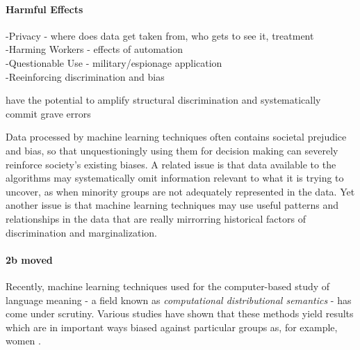 \documentclass{article}
\begin{document}
\paragraph{Harmful Effects}
-Privacy - where does data get taken from, who gets to see it, treatment\\
-Harming Workers - effects of automation\\
-Questionable Use - military/espionage application\\
-Reeinforcing discrimination and bias

have the potential to amplify structural discrimination and systematically commit grave errors

Data processed by machine learning techniques often contains societal prejudice and bias, so that unquestioningly using them for decision making can severely reinforce society's existing biases.
A related issue is that data available to the algorithms may systematically omit information relevant to what it is trying to uncover, as when minority groups are not adequately represented in the data.
Yet another issue is that machine learning techniques may use useful patterns and relationships in the data that are really mirrorring historical factors of discrimination and marginalization. \cite{barocas2016big}

\paragraph{2b moved}
Recently, machine learning techniques used for the computer-based study of language meaning - a field known as \emph{computational distributional semantics} - has come under scrutiny.
Various studies have shown that these methods yield results which are in important ways biased against particular groups as, for example, women \cite{google} \cite{wagner2015s}.
\end{document}
